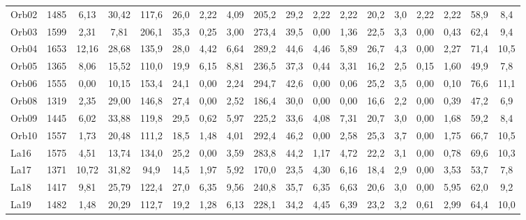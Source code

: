 \begin{landscape}
\begin{table}[H]
\begin{tabular}{ll|cccc|cccc|cccc|cccc}
Orb02                      & 1485                   & 6,13   & 30,42  & 117,6 & 26,0  & 2,22   & 4,09   & 205,2 & 29,2  & 2,22    & 2,22   & 20,2  & 3,0   & 2,22    & 2,22   & 58,9  & 8,4   \\
Orb03                      & 1599                   & 2,31   & 7,81   & 206,1 & 35,3  & 0,25   & 3,00   & 273,4 & 39,5  & 0,00    & 1,36   & 22,5  & 3,3   & 0,00    & 0,43   & 62,4  & 9,4   \\
Orb04                      & 1653                   & 12,16  & 28,68  & 135,9 & 28,0  & 4,42   & 6,64   & 289,2 & 44,6  & 4,46    & 5,89   & 26,7  & 4,3   & 0,00    & 2,27   & 71,4  & 10,5  \\
Orb05                      & 1365                   & 8,06   & 15,52  & 110,0 & 19,9  & 6,15   & 8,81   & 236,5 & 37,3  & 0,44    & 3,31   & 16,2  & 2,5   & 0,15    & 1,60   & 49,9  & 7,8   \\
Orb06                      & 1555                   & 0,00   & 10,15  & 153,4 & 24,1  & 0,00   & 2,24   & 294,7 & 42,6  & 0,00    & 0,06   & 25,2  & 3,5   & 0,00    & 0,10   & 76,6  & 11,1  \\
Orb08                      & 1319                   & 2,35   & 29,00  & 146,8 & 27,4  & 0,00   & 2,52   & 186,4 & 30,0  & 0,00    & 0,00   & 16,6  & 2,2   & 0,00    & 0,39   & 47,2  & 6,9   \\
Orb09                      & 1445                   & 6,02   & 33,88  & 119,8 & 29,5  & 0,62   & 5,97   & 225,2 & 33,6  & 4,08    & 7,31   & 20,7  & 3,0   & 0,00    & 1,68   & 59,2  & 8,4   \\
Orb10                      & 1557                   & 1,73   & 20,48  & 111,2 & 18,5  & 1,48   & 4,01   & 292,4 & 46,2  & 0,00    & 2,58   & 25,3  & 3,7   & 0,00    & 1,75   & 66,7  & 10,5  \\
La16                       & 1575                   & 4,51   & 13,74  & 134,0 & 25,2  & 0,00   & 3,59   & 283,8 & 44,2  & 1,17    & 4,72   & 22,2  & 3,1   & 0,00    & 0,78   & 69,6  & 10,3  \\
La17                       & 1371                   & 10,72  & 31,82  & 94,9  & 14,5  & 1,97   & 5,92   & 170,0 & 23,5  & 4,30    & 6,16   & 18,4  & 2,9   & 0,00    & 3,53   & 53,7  & 7,8   \\
La18                       & 1417                   & 9,81   & 25,79  & 122,4 & 27,0  & 6,35   & 9,56   & 240,8 & 35,7  & 6,35    & 6,63   & 20,6  & 3,0   & 0,00    & 5,95   & 62,0  & 9,2   \\
La19                       & 1482                   & 1,48   & 20,29  & 112,7 & 19,2  & 1,28   & 6,13   & 228,1 & 34,2  & 4,45    & 6,39   & 23,2  & 3,2   & 0,61    & 2,99   & 64,4  & 10,0  \\

\end{tabular}
\end{table}
\end{landscape}
